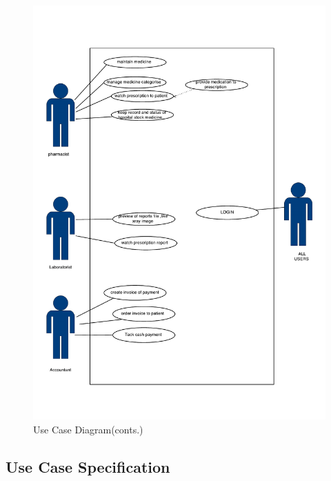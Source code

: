 \documentclass[14pt]{article}
\begin{document}
\begin{figure}[h!]
\centering 
  \caption{Use Case Diagram(conts.)}
  \includegraphics[width=14.3cm]{hospitalDiagram-2.pdf}
\end{figure}
\newpage 
\subsection{Use Case Specification}
\end{document}
